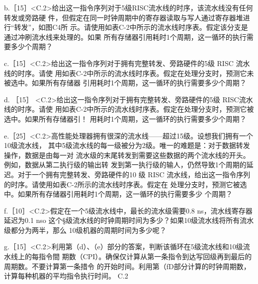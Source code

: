b.［15］<C.2>给出这一指令序列对于5级RISC流水线的时序，该流水线没有任何转发或旁路硬
件，但假定在同一时钟周期中的寄存器读取与写人通过寄存器堆进行“转发”，如图C4所
示。请使用如表C-2中所示的流水线时序表。假定该分支是通过冲刷流水线来处理的。如果
所有存储器引用耗时1个周期，这一循环的执行需要多少个周期？

c.［15］<C.2>给出这一指令序列对于拥有完整转发、旁路硬件的5级 RISC 流水线的时序。请使
用如表C-2中所示的流水线时序表。假定在处理分支时，预测它未被选中。如果所有存储器
引用耗时1个周期，这一循环的执行需要多少个周期？

d. ［15］ <C.2>给出这一指令序列对于拥有完整转发、旁路硬件的5级 RISC流水线的时序。请使
用如表C-2中所示的流水线时序表。假定在处理分支时，预测它被选中。如果所有存储器引！
用耗时1个周期，这一循环的执行需要多少个周期？

e.［25］<C.2>高性能处理器拥有很深的流水线——超过15级。设想我们拥有一个10级流水线，
其中5级流水线的每一级被分为2级。唯一的难题是：对于数据转发操作，数据是由每一对
流水级的末尾转发到需要这些数据的两个流水线的开头。例如，数据从第二执行级的输出转
发到第一执行级的输人，仍然导致1个周期的延迟。对于一个拥有完整转发、旁路硬件的10
级 RISC 流水线，给出这一指令序列的时序。请使用如表C-2所示的流水线时序表。假定在
处理分支时，预测它被选中。如果所有存储器引用耗时1个周期，这一循环的执行需要多少
个周期？

f.［10］<C.2>假定在一个5级流水线中，最长的流水级需要0.8 ns，流水线寄存器延迟为0.1 nso
这个§级流水线的时钟周期时间为多少？如果10级流水线将所有流水级都分为两半，那么
10级机器的周期时间为多少呢？

g.［15］<C.2>利用第（d）、（e）部分的答案，判断该循环在5级流水线和10级流水线上的每指令間
期数（CPI）。确保仅计算从第一条指令到达写回级再到最后的周期数。不要计算第一条措令
的开始时间。利用第（fD部分计算的时钟周期数，计算每种机器的平均指令执行时间。
C.2

